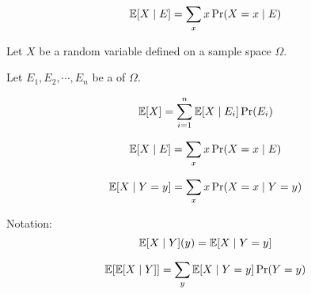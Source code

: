 
\begin{frame}{}
  \begin{definition}
    \[
      \operatorname*{\mathbb{E}}[X \mid E] = \sum_{x} x \Pr(X = x \mid E)
    \]
  \end{definition}
\end{frame}

\begin{frame}{}
  \begin{theorem}
    Let $X$ be a random variable defined on a sample space $\Omega$.

    Let $E_1, E_2, \cdots, E_n$ be a  of $\Omega$.

    \[
      \operatorname*{\mathbb{E}}[X] = \sum_{i=1}^{n} \operatorname*{\mathbb{E}}[X \mid E_i] \Pr(E_i)
    \]
  \end{theorem}

\end{frame}

\begin{frame}{}
  \begin{definition}
    \[
      \operatorname*{\mathbb{E}}[X \mid E] = \sum_{x} x \Pr(X = x \mid E)
    \]
  \end{definition}

  \pause
  \vspace{0.50cm}
  \begin{definition}
    \[
      \operatorname*{\mathbb{E}}[X \mid Y = y] = \sum_{x} x \Pr(X = x \mid Y = y)
    \]
  \end{definition}
\end{frame}

\begin{frame}{}
  \begin{alertblock}{Notation:}
    \[
      \operatorname*{\mathbb{E}}[X \mid Y](y) = \operatorname*{\mathbb{E}}[X \mid Y = y]
    \]
  \end{alertblock}

  \pause
  \[
    \operatorname*{\mathbb{E}}[\operatorname*{\mathbb{E}}[X \mid Y]] = \sum_{y} \operatorname*{\mathbb{E}}[X \mid Y = y] \Pr(Y = y)
  \]
\end{frame}

\begin{frame}{}
\end{frame}
